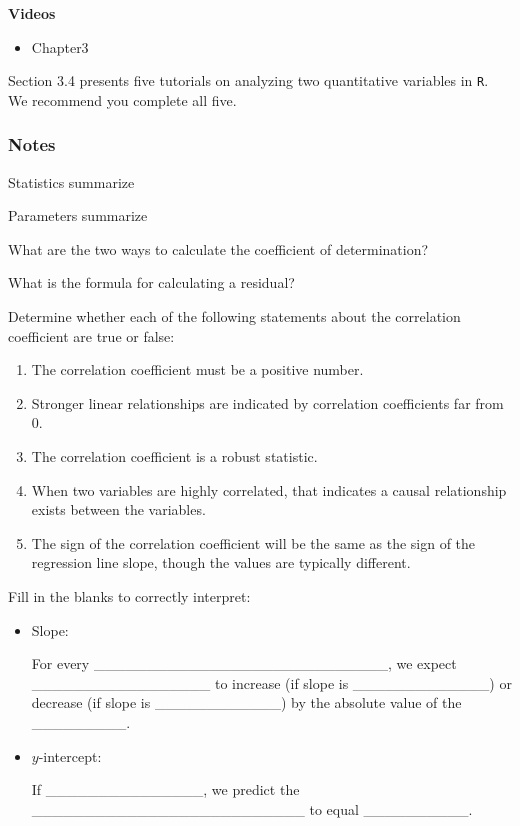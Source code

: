 \documentclass[
]{report}
\providecommand{\tightlist}{%
  \setlength{\itemsep}{0pt}\setlength{\parskip}{0pt}}
\newcommand{\rgs}{\vspace{12pt}} %
\begin{document}

\textbf{Videos}

\begin{itemize}
\tightlist
\item
  Chapter3
\end{itemize}


Section 3.4 presents five tutorials on analyzing two quantitative variables in \texttt{R}. We recommend you complete all five.

\hypertarget{notes-11}{%
\subsubsection*{Notes}\label{notes-11}}

Statistics summarize
\rgs

Parameters summarize
\rgs

What are the two ways to calculate the coefficient of determination?
\rgs

What is the formula for calculating a residual?
\rgs

Determine whether each of the following statements about the correlation coefficient are true or false:

\begin{enumerate}
\def\labelenumi{\arabic{enumi}.}
\item
  The correlation coefficient must be a positive number.
\item
  Stronger linear relationships are indicated by correlation coefficients far from 0.
\item
  The correlation coefficient is a robust statistic.
\item
  When two variables are highly correlated, that indicates a causal relationship exists between the variables.
\item
  The sign of the correlation coefficient will be the same as the sign of the regression line slope, though the values are typically different.
\end{enumerate}

Fill in the blanks to correctly interpret:

\begin{itemize}
\item
  Slope:

  For every \_\_\_\_\_\_\_\_\_\_\_\_\_\_\_\_\_\_\_\_\_\_\_\_\_\_\_\_, we expect \_\_\_\_\_\_\_\_\_\_\_\_\_\_\_\_\_ to increase (if slope is \_\_\_\_\_\_\_\_\_\_\_\_\_) or decrease (if slope is \_\_\_\_\_\_\_\_\_\_\_\_) by the absolute value of the \_\_\_\_\_\_\_\_\_.
\item
  \(y\)-intercept:

  If \_\_\_\_\_\_\_\_\_\_\_\_\_\_\_, we predict the \_\_\_\_\_\_\_\_\_\_\_\_\_\_\_\_\_\_\_\_\_\_\_\_\_\_ to equal \_\_\_\_\_\_\_\_\_\_.
\end{itemize}
\end{document}

